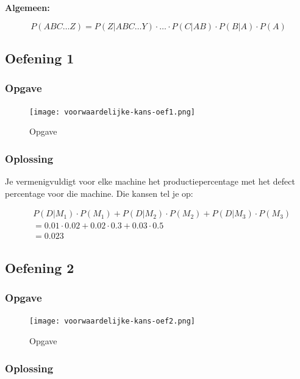 \documentclass{article}
\begin{document}
\textbf{Algemeen:}

\begin{equation}
    P(ABC\dots Z) = P(Z|ABC\dots Y) \cdot \dots \cdot P (C| A B ) \cdot P(B|A) \cdot P(A)
\end{equation}

\subsection{Oefening 1}

\subsubsection{Opgave}

\begin{figure}[H]
    \centering
    \texttt{[image: voorwaardelijke-kans-oef1.png]}
    \caption{Opgave}
\end{figure}

\subsubsection{Oplossing}

Je vermenigvuldigt voor elke machine het productiepercentage met het defect percentage voor die machine. 
Die kansen tel je op:

\begin{center}
    \begin{align*}
        & P(D | M_1) \cdot P(M_1) + P(D | M_2) \cdot P(M_2) + P(D | M_3) \cdot P(M_3)\\
        & = 0.01 \cdot 0.02 + 0.02 \cdot 0.3 + 0.03 \cdot 0.5 \\
        & = 0.023
    \end{align*}
\end{center}

\subsection{Oefening 2}

\subsubsection{Opgave}

\begin{figure}[H]
    \centering
    \texttt{[image: voorwaardelijke-kans-oef2.png]}
    \caption{Opgave}
\end{figure}

\subsubsection{Oplossing}
\end{document}
